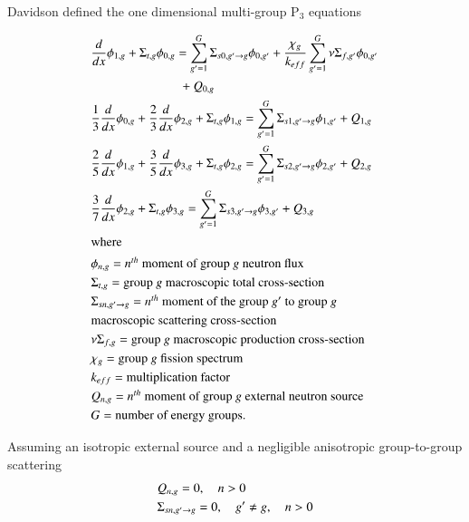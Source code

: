 \documentclass{anstrans}
\begin{document}
Davidson \cite{davidson_neutron_1957} defined the one dimensional multi-group P$_3$ equations 

\begin{align}
    & \frac{d}{dx} \phi_{1,g} + \Sigma_{t,g} \phi_{0,g} = \sum_{g'=1}^G \Sigma_{s0,g' \rightarrow g} \phi_{0,g'} + \frac{\chi_g}{k_{eff}} \sum_{g'=1}^G \nu\Sigma_{f,g'} \phi_{0,g'} \notag \\ & \quad \quad \quad \quad \quad \quad \quad + Q_{0,g}  \label{eq:P3-0} \\
    & \frac{1}{3} \frac{d}{dx} \phi_{0,g} + \frac{2}{3}\frac{d}{dx}\phi_{2,g} + \Sigma_{t,g} \phi_{1,g} = \sum_{g'=1}^G \Sigma_{s1,g' \rightarrow g} \phi_{1,g'} + Q_{1,g} \label{eq:P3-1} \\
    & \frac{2}{5} \frac{d}{dx}\phi_{1,g} + \frac{3}{5}\frac{d}{dx}\phi_{3,g} + \Sigma_{t,g} \phi_{2,g} = \sum_{g'=1}^G \Sigma_{s2,g' \rightarrow g} \phi_{2,g'} + Q_{2,g} \label{eq:P3-2} \\
    & \frac{3}{7}\frac{d}{dx}\phi_{2,g} + \Sigma_{t,g} \phi_{3,g} = \sum_{g'=1}^G \Sigma_{s3,g' \rightarrow g} \phi_{3,g'} + Q_{3,g} \label{eq:P3-3} \\
    \intertext{where}
    & \phi_{n,g} = \mbox{$n^{th}$ moment of group $g$ neutron flux}  \notag \\ %
    & \Sigma_{t,g} = \mbox{group $g$ macroscopic total cross-section}  \notag \\ %
	& \Sigma_{sn,g' \rightarrow g} = \mbox{$n^{th}$ moment of the group $g'$ to group $g$} \notag \\
	& \mbox{macroscopic scattering cross-section}  \notag \\ %
	& \nu\Sigma_{f,g} = \mbox{group $g$ macroscopic production cross-section}  \notag \\ %
	& \chi_{g} = \mbox{group $g$ fission spectrum}  \notag \\ %
	& k_{eff} = \mbox{multiplication factor}  \notag \\ %
	& Q_{n,g} = \mbox{$n^{th}$ moment of group $g$ external neutron source}  \notag \\  %
	& G = \mbox{number of energy groups}.  \notag %
\end{align}

Assuming an isotropic external source and a negligible anisotropic group-to-group scattering \cite{brantley_simplifiedP3_2000}
\begin{align}
	& Q_{n,g} = 0, \quad n > 0 \notag \\
	& \Sigma_{sn,g' \rightarrow g} = 0, \quad g' \ne g, \quad n > 0 \notag
\end{align}
\end{document}
